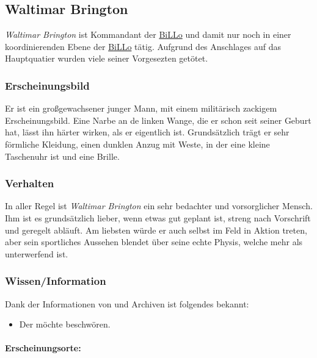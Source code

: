\subsection{Waltimar Brington}
    \label{pers:waltimar-brington}
    \emph{Waltimar Brington} ist Kommandant der \hyperref[subsubsec:billo]{BiLLo} und damit nur noch in einer koordinierenden Ebene der \hyperref[subsubsec:billo]{BiLLo} tätig. Aufgrund des Anschlages auf das Hauptquatier wurden viele seiner Vorgesezten getötet.

    \subsubsection{Erscheinungsbild}
        Er ist ein großgewachsener junger Mann, mit einem militärisch zackigem Erscheinungsbild. Eine Narbe an de linken Wange, die er schon seit seiner Geburt hat, lässt ihn härter wirken, als er eigentlich ist. Grundsätzlich trägt er sehr förmliche Kleidung, einen dunklen Anzug mit Weste, in der eine kleine Taschenuhr ist und eine Brille.

    \subsubsection{Verhalten}
        In aller Regel ist \emph{Waltimar Brington} ein sehr bedachter und vorsorglicher Mensch. Ihm ist es grundsätzlich lieber, wenn etwas gut geplant ist, streng nach Vorschrift und geregelt abläuft. Am liebsten würde er auch selbst im Feld in Aktion treten, aber sein sportliches Aussehen blendet über seine echte Physis, welche mehr als unterwerfend ist.

    \subsubsection{Wissen/Information}
        Dank der Informationen von  und Archiven ist folgendes bekannt:
        \begin{itemize}
            \item Der  möchte  beschwören.
        \end{itemize}

    \paragraph{Erscheinungsorte:} 
